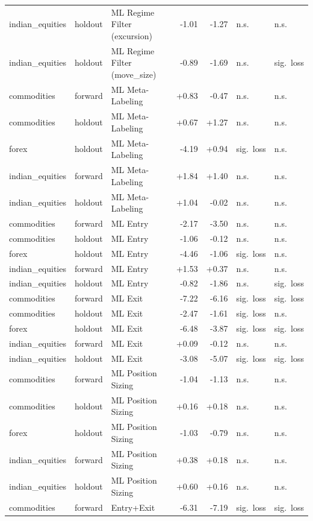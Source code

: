 \begin{longtable}{l l l r r l l}
indian\_equities & holdout & ML Regime Filter (excursion) & -1.01 & -1.27 & n.s. & n.s. \\
indian\_equities & holdout & ML Regime Filter (move\_size) & -0.89 & -1.69 & n.s. & sig.\ loss \\
commodities & forward & ML Meta-Labeling & +0.83 & -0.47 & n.s. & n.s. \\
commodities & holdout & ML Meta-Labeling & +0.67 & +1.27 & n.s. & n.s. \\
forex & holdout & ML Meta-Labeling & -4.19 & +0.94 & sig.\ loss & n.s. \\
indian\_equities & forward & ML Meta-Labeling & +1.84 & +1.40 & n.s. & n.s. \\
indian\_equities & holdout & ML Meta-Labeling & +1.04 & -0.02 & n.s. & n.s. \\
commodities & forward & ML Entry & -2.17 & -3.50 & n.s. & n.s. \\
commodities & holdout & ML Entry & -1.06 & -0.12 & n.s. & n.s. \\
forex & holdout & ML Entry & -4.46 & -1.06 & sig.\ loss & n.s. \\
indian\_equities & forward & ML Entry & +1.53 & +0.37 & n.s. & n.s. \\
indian\_equities & holdout & ML Entry & -0.82 & -1.86 & n.s. & sig.\ loss \\
commodities & forward & ML Exit & -7.22 & -6.16 & sig.\ loss & sig.\ loss \\
commodities & holdout & ML Exit & -2.47 & -1.61 & sig.\ loss & n.s. \\
forex & holdout & ML Exit & -6.48 & -3.87 & sig.\ loss & sig.\ loss \\
indian\_equities & forward & ML Exit & +0.09 & -0.12 & n.s. & n.s. \\
indian\_equities & holdout & ML Exit & -3.08 & -5.07 & sig.\ loss & sig.\ loss \\
commodities & forward & ML Position Sizing & -1.04 & -1.13 & n.s. & n.s. \\
commodities & holdout & ML Position Sizing & +0.16 & +0.18 & n.s. & n.s. \\
forex & holdout & ML Position Sizing & -1.03 & -0.79 & n.s. & n.s. \\
indian\_equities & forward & ML Position Sizing & +0.38 & +0.18 & n.s. & n.s. \\
indian\_equities & holdout & ML Position Sizing & +0.60 & +0.16 & n.s. & n.s. \\
commodities & forward & Entry+Exit & -6.31 & -7.19 & sig.\ loss & sig.\ loss \\

\end{longtable}
